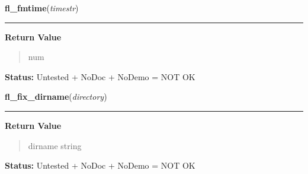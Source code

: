 \hspace{.8\funcindent}\begin{boxedminipage}{\funcwidth}

    \raggedright \textbf{fl\_fmtime}(\textit{timestr})

    \vspace{-1.5ex}

    \rule{\textwidth}{0.5\fboxrule}
\setlength{\parskip}{2ex}
\setlength{\parskip}{1ex}
      \textbf{Return Value}
    \vspace{-1ex}

      \begin{quote}
      num

      \end{quote}

\textbf{Status:} Untested + NoDoc + NoDemo = NOT OK



    \end{boxedminipage}

    \label{xformslib:library:fl_fix_dirname}

    \vspace{0.5ex}

\hspace{.8\funcindent}\begin{boxedminipage}{\funcwidth}

    \raggedright \textbf{fl\_fix\_dirname}(\textit{directory})

    \vspace{-1.5ex}

    \rule{\textwidth}{0.5\fboxrule}
\setlength{\parskip}{2ex}
\setlength{\parskip}{1ex}
      \textbf{Return Value}
    \vspace{-1ex}

      \begin{quote}
      dirname string

      \end{quote}

\textbf{Status:} Untested + NoDoc + NoDemo = NOT OK



    \end{boxedminipage}

    \label{xformslib:library:flps_init}

